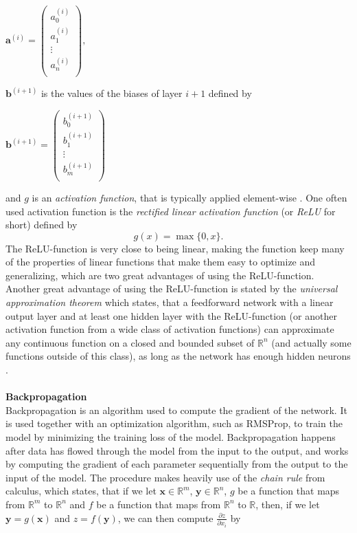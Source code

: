 \documentclass[./main.tex]{subfiles}
\begin{document}
\begin{center}
    \begin{math}
        \bm{a}^{(i)} =
        \begin{pmatrix}
            a_{0} ^{(i)} \\
            a_{1} ^{(i)} \\
            \vdots \\
            a_{n} ^{(i)} \\
        \end{pmatrix}
        ,
    \end{math}
\end{center}
$\bm{b}^{(i + 1)}$ is the values of the biases of layer $i + 1$ defined by
\begin{center}
    \begin{math}
        \bm{b}^{(i + 1)} =
        \begin{pmatrix}
            b_{0} ^{(i + 1)} \\
            b_{1} ^{(i + 1)} \\
            \vdots \\
            b_{m} ^{(i + 1)} \\
        \end{pmatrix}
    \end{math}
\end{center}
and $g$ is an \textit{activation function}, that is typically applied element-wise \cite{DeepLearning} \cite{3b1b_1}. One often used activation function is the \textit{rectified linear activation function} (or \textit{ReLU} for short) defined by
$$g(x) = \max\{0, x\}.$$
The ReLU-function is very close to being linear, making the function keep many of the properties of linear functions that make them easy to optimize and generalizing, which are two great advantages of using the ReLU-function. Another great advantage of using the ReLU-function is stated by the \textit{universal approximation theorem} which states, that a feedforward network with a linear output layer and at least one hidden layer with the ReLU-function (or another activation function from a wide class of activation functions) can approximate any continuous function on a closed and bounded subset of $\mathbb{R}^n$ (and actually some functions outside of this class), as long as the network has enough hidden neurons \cite{DeepLearning}. 
\\
\\
\noindent \textbf{Backpropagation} \\
Backpropagation is an algorithm used to compute the gradient of the network. It is used together with an optimization algorithm, such as RMSProp, to train the model by minimizing the training loss of the model. Backpropagation happens after data has flowed through the model from the input to the output, and works by computing the gradient of each parameter sequentially from the output to the input of the model. The procedure makes heavily use of the \textit{chain rule} from calculus, which states, that if we let $\bm{x} \in \mathbb{R}^m$, $\bm{y} \in \mathbb{R}^n$, $g$ be a function that maps from $\mathbb{R}^m$ to $\mathbb{R}^n$ and $f$ be a function that maps from $\mathbb{R}^n$ to $\mathbb{R}$, then, if we let $\bm{y} = g(\bm{x})$ and $z = f(\bm{y})$, we can then compute $\frac{\partial z}{\partial x_i}$ by
\end{document}
